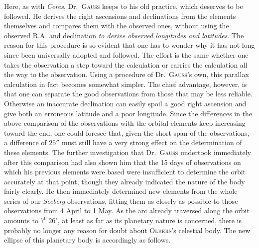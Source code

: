 Here, as with \textit{Ceres}, Dr.\ \textsc{Gauss} keeps to his old practice, which deserves to be followed. He derives the right ascensions and declinations from the elements themselves and compares them with the observed ones, without using the observed R.A. and declination \textit{to derive observed longitudes and latitudes}. The reason for this procedure is so evident that one has to wonder why
%
it has not long since been universally adopted and followed. The effort is the same whether one takes the observation a step toward the calculation or carries the calculation all the way to the observation. Using a procedure of Dr.\ \textsc{Gauss}'s own, this parallax calculation in fact becomes somewhat simpler. The chief advantage, however, is that one can separate the good observations from those that may be less reliable. Otherwise an inaccurate declination can easily spoil a good right ascension and give both an erroneous latitude and a poor longitude. Since the differences in the above comparison of the observations with the orbital elements keep increasing toward the end, one could foresee that, given the short span of the observations, a difference of $25''$ must still have a very strong effect on the determination of these elements. The further investigation that Dr.\ \textsc{Gauss} undertook immediately after this comparison had also shown him that the 15 days of observations on which his previous elements were based were insufficient to determine the orbit accurately at that point, though they already indicated the nature of the body fairly clearly. He then immediately determined new elements from the whole series of our \textit{Seeberg} observations, fitting them as closely as possible to those observations from 4 April to 1 May. As the arc already traversed along the orbit amounts to $7^0\ 26'$, at least as far as its planetary nature is concerned, there is probably no longer any reason for doubt about \textsc{Olbers}'s celestial body. The new ellipse of this planetary body is accordingly as follows.
